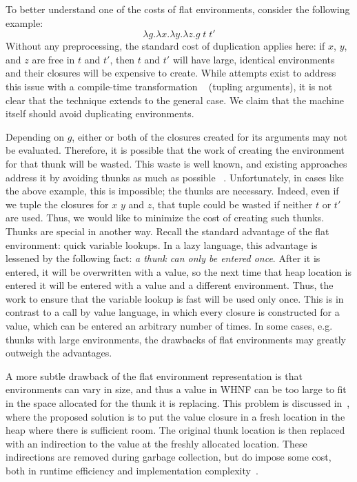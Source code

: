 To better understand one of the costs of flat environments, consider the
following example: $$\lambda g.\lambda x.\lambda y.\lambda z.g
\; t \;t'$$ Without any preprocessing, the standard cost of duplication applies
here: if $x$, $y$, and $z$ are free in $t$ and $t'$, then $t$ and $t'$ will have
large, identical environments and their closures will be expensive to create.
While attempts exist to address this issue with a compile-time transformation
~\cite{peyton1992implementing} (tupling arguments), it is not clear that the
technique extends to the general case. We claim that the machine itself should
avoid duplicating environments.

Depending on $g$, either or both of the closures created for its arguments may
not be evaluated.  Therefore, it is possible that the work of creating the
environment for that thunk will be wasted. This waste is well known, and
existing approaches address it by avoiding thunks as much as possible
~\cite{jonesstg, johnsson1984efficient}. Unfortunately, in cases like the above
example, this is impossible; the thunks are necessary. Indeed, even if we tuple
the closures for $x$ $y$ and $z$, that tuple could be wasted if neither $t$ or
$t'$ are used. Thus, we would like to minimize the cost of creating such thunks.
Thunks are special in another way.  Recall the standard advantage of the flat
environment: quick variable lookups. In a lazy language, this advantage is
lessened by the following fact: \emph{a thunk can only be entered once}. After
it is entered, it will be overwritten with a value, so the next time that heap
location is entered it will be entered with a value and a different environment.
Thus, the work to ensure that the variable lookup is fast will be used only
once. This is in contrast to a call by value language, in which every closure is
constructed for a value, which can be entered an arbitrary number of times. In
some cases, e.g. thunks with large environments, the drawbacks of flat
environments may greatly outweigh the advantages.

A more subtle drawback of the flat environment representation is that
environments can vary in size, and thus a value in WHNF can be too large to fit
in the space allocated for the thunk it is replacing. This problem is discussed
in~\cite{jonesstg}, where the proposed solution is to put the value closure in
a fresh location in the heap where there is sufficient room. The original
thunk location is then replaced with an indirection to the value at the freshly
allocated location. These indirections are removed during garbage collection,
but do impose some cost, both in runtime efficiency and implementation
complexity~\cite{jonesstg}.

